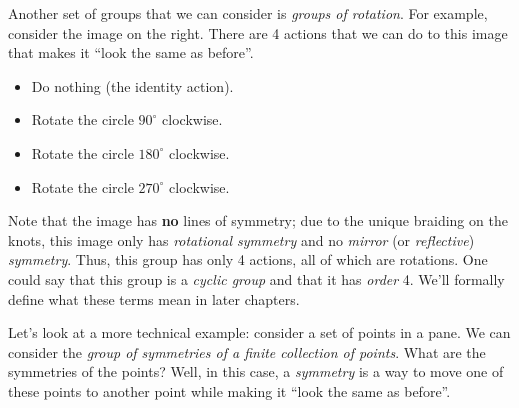 \begin{figure}
    \centering
\end{figure}

Another set of groups that we can consider is \textit{groups of rotation}. For example, consider the image on the right. There are 4 actions that we can do to this image that makes it ``look the same as before''.
\begin{itemize}
    \item Do nothing (the identity action).
    \item Rotate the circle $90^\circ$ clockwise.
    \item Rotate the circle $180^\circ$ clockwise.
    \item Rotate the circle $270^\circ$ clockwise.
\end{itemize}
Note that the image has \textbf{no} lines of symmetry; due to the unique braiding on the knots, this image only has \textit{rotational symmetry} and no \textit{mirror} (or \textit{reflective}) \textit{symmetry}. Thus, this group has only 4 actions, all of which are rotations. One could say that this group is a \textit{cyclic group} and that it has \textit{order} 4. We'll formally define what these terms mean in later chapters.

\begin{figure}
    \centering
\end{figure}

\newpage

Let's look at a more technical example: consider a set of points in a pane. We can consider the \textit{group of symmetries of a finite collection of points}. What are the symmetries of the points? Well, in this case, a \textit{symmetry} is a way to move one of these points to another point while making it ``look the same as before''.

